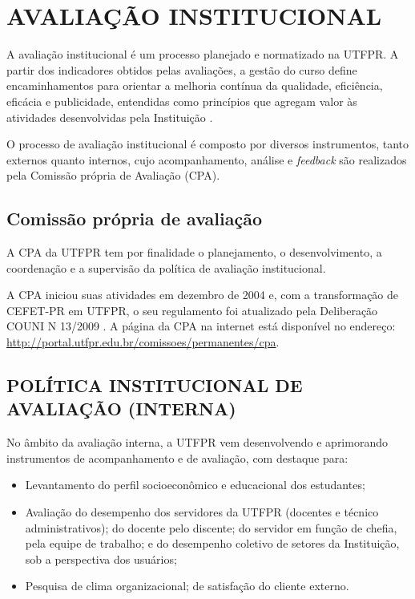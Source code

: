 \chapter{AVALIAÇÃO INSTITUCIONAL}

A avaliação institucional é um processo planejado e normatizado na UTFPR. A partir dos indicadores obtidos pelas avaliações, a gestão do curso define encaminhamentos para orientar a melhoria contínua da qualidade, eficiência, eficácia e publicidade, entendidas como princípios que agregam valor às atividades desenvolvidas pela Instituição \cite{pdiutfpr}. 

O processo de avaliação institucional é composto por diversos instrumentos, tanto externos quanto internos, cujo acompanhamento, análise e \textit{feedback} são realizados pela Comissão própria de Avaliação (CPA).


\section{Comissão própria de avaliação}

A CPA da UTFPR tem por finalidade o planejamento, o desenvolvimento, a coordenação e a supervisão da política de avaliação institucional.

A CPA iniciou suas atividades em dezembro de 2004 \cite{couni8} e, com a transformação de CEFET-PR em UTFPR, o seu regulamento foi atualizado pela Deliberação COUNI N\textordmasculine{} 13/2009 \cite{couni13}. A página da CPA na internet está disponível no endereço: \url{http://portal.utfpr.edu.br/comissoes/permanentes/cpa}.

\section{POLÍTICA INSTITUCIONAL DE AVALIAÇÃO (INTERNA)}

No âmbito da avaliação interna, a UTFPR vem desenvolvendo e aprimorando instrumentos de acompanhamento e de avaliação, com destaque para:

\begin{itemize}
    \item Levantamento do perfil socioeconômico e educacional dos estudantes; 
    \item Avaliação do desempenho dos servidores da UTFPR (docentes e técnico administrativos); do docente pelo discente; do servidor em função de chefia, pela equipe de trabalho; e do desempenho coletivo de setores da Instituição, sob a perspectiva dos usuários;
    \item Pesquisa de clima organizacional; de satisfação do cliente externo.
\end{itemize}


